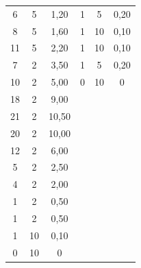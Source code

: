 \documentclass[titlepage = firstcover]{scrartcl}
\begin{document}
\begin{table}[h]
\begin{tabular}{c c c c c c}
                    6 & 5 & 1,20 & 1 & 5 & 0,20\\
                    8 & 5 & 1,60 & 1 & 10 & 0,10\\
                    11 & 5 & 2,20 & 1 & 10 & 0,10\\
                    7 & 2 & 3,50 & 1 & 5 & 0,20\\
                    10 & 2 & 5,00 & 0 & 10 & 0\\
                    18 & 2 & 9,00 & & &\\
                    21 & 2 & 10,50 & & &\\
                    20 & 2 & 10,00 & & &\\
                    12 & 2 & 6,00 & & &\\
                    5 & 2 & 2,50 & & &\\
                    4 & 2 & 2,00 & & &\\
                    1 & 2 & 0,50 & & &\\
                    1 & 2 & 0,50 & & &\\
                    1 & 10 & 0,10 & & &\\
                    0 & 10 & 0 & & &\\

                \bottomrule
            \end{tabular}
           
        \end{table}
       
        \FloatBarrier
        \noindent


            
            
            
            


        
\end{document}
